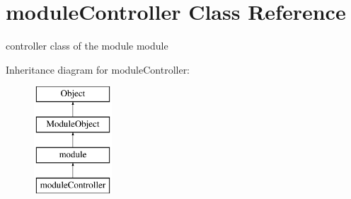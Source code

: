 \hypertarget{classmoduleController}{\section{module\-Controller Class Reference}
\label{classmoduleController}
}


controller class of the module module  


Inheritance diagram for module\-Controller\-:\begin{figure}[H]
\begin{center}
\leavevmode
\includegraphics[height=4.000000cm]{classmoduleController}
\end{center}
\end{figure}
